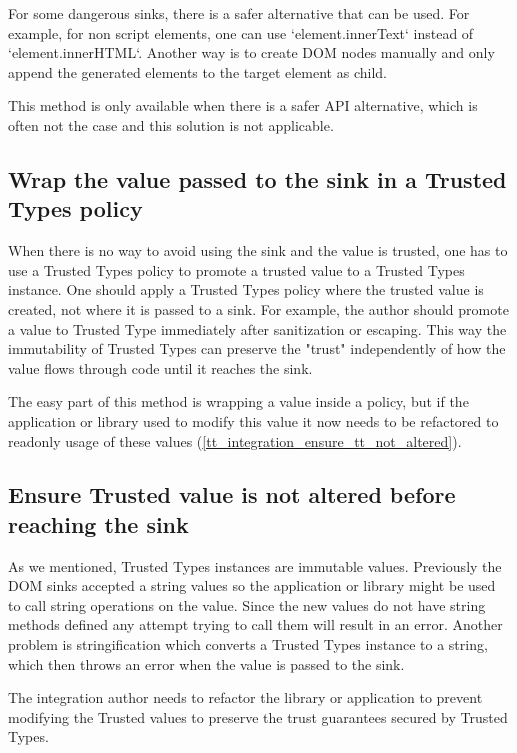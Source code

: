 For some dangerous sinks, there is a safer alternative that can be used. For example, for non script
elements, one can use `element.innerText` instead of `element.innerHTML`. Another way is to create
DOM nodes manually and only append the generated elements to the target element as child.

This method is only available when there is a safer API alternative, which is often not the case and
this solution is not applicable.

\subsection{Wrap the value passed to the sink in a Trusted Types policy}

When there is no way to avoid using the sink and the value is trusted, one has to use a Trusted
Types policy to promote a trusted value to a Trusted Types instance. One should apply a Trusted
Types policy where the trusted value is created, not where it is passed to a sink. For example, the
author should promote a value to Trusted Type immediately after sanitization or escaping. This way
the immutability of Trusted Types can preserve the "trust" independently of how the value flows
through code until it reaches the sink.

The easy part of this method is wrapping a value inside a policy, but if the application
or library used to modify this value it now needs to be refactored to readonly usage of these values
(\ref{tt_integration_ensure_tt_not_altered}).

\label{tt_integration_ensure_tt_not_altered}
\subsection{Ensure Trusted value is not altered before reaching the sink}

As we mentioned, Trusted Types instances are immutable values. Previously the DOM sinks accepted a
string values so the application or library might be used to call string operations on the value.
Since the new values do not have string methods defined any attempt trying to call them will result
in an error. Another problem is stringification which converts a Trusted Types instance to a string,
which then throws an error when the value is passed to the sink.

The integration author needs to refactor the library or application to prevent modifying the
Trusted values to preserve the trust guarantees secured by Trusted Types.

